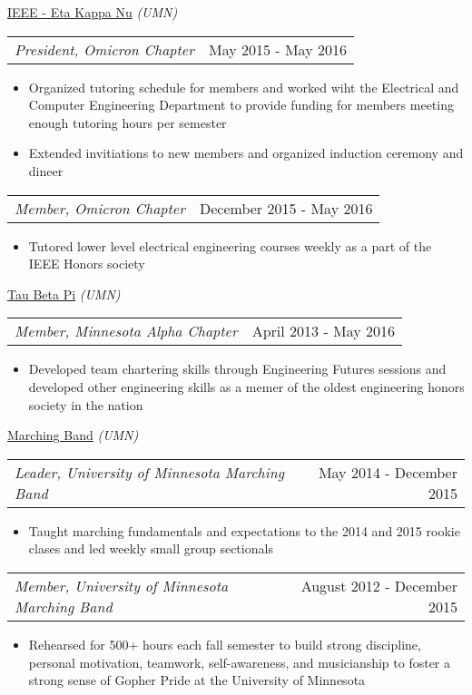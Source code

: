 \documentclass[10pt, letterpaper]{article}
\makeatletter
\newcommand{\headerrow}[2]
{\begin{tabular*}{\linewidth}{l@{\extracolsep{\fill}}r}
	#1 &
	#2 \\
\end{tabular*}}
\makeatother
\begin{document}
{\uline{IEEE - Eta Kappa Nu} \textit{(UMN)}

\headerrow
	{\quad\textit{President, Omicron Chapter}}
	{May 2015 - May 2016}
	\begin{itemize}
		\item Organized tutoring schedule for members and worked wiht the Electrical and Computer Engineering Department to provide funding for members meeting enough tutoring hours per semester
		\item Extended invitiations to new members and organized induction ceremony and dineer
	\end{itemize}

\headerrow
	{\quad\textit{Member, Omicron Chapter}}
	{December 2015 - May 2016}
	\begin{itemize}
		\item Tutored lower level electrical engineering courses weekly as a part of the IEEE Honors society
	\end{itemize}

{\uline{Tau Beta Pi} \textit{(UMN)}

\headerrow
	{\quad\textit{Member, Minnesota Alpha Chapter}}
	{April 2013 - May 2016}
	\begin{itemize}
		\item Developed team chartering skills through Engineering Futures sessions and developed other engineering skills as a memer of the oldest engineering honors society in the nation
	\end{itemize}

{\uline{Marching Band} \textit{(UMN)}}

\headerrow
	{\quad\textit{Leader, University of Minnesota Marching Band}}
	{May 2014 - December 2015}
	\begin{itemize}
		\item Taught marching fundamentals and expectations to the 2014 and 2015 rookie clases and led weekly small group sectionals
	\end{itemize}

\headerrow
	{\quad\textit{Member, University of Minnesota Marching Band}}
	{August 2012 - December 2015}
	\begin{itemize}
		\item Rehearsed for 500+ hours each fall semester to build strong discipline, personal motivation, teamwork, self-awareness, and musicianship to foster a strong sense of Gopher Pride at the University of Minnesota
	\end{itemize}

}}
\end{document}

